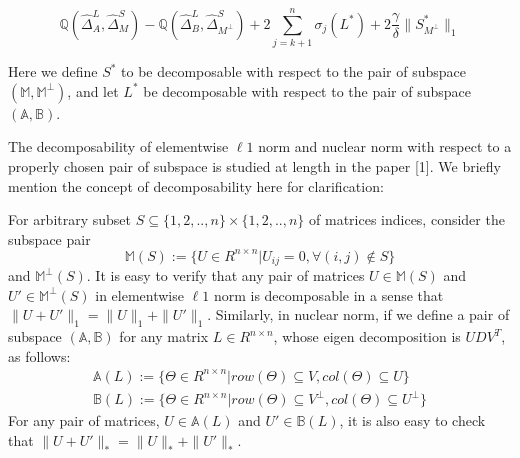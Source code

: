 \documentclass{article}
\begin{document}
\begin{equation}\label{eq:5}
    \mathbb{Q}(\hat{\Delta}^L_{A},\hat{\Delta}^S_{M}) - \mathbb{Q}(\hat{\Delta}^L_{B},\hat{\Delta}^S_{M^\perp})
    +2 \sum_{j=k+1}^{n} \sigma_{j}(L^*) + 2\frac{\gamma}{\delta}\|S^*_{M^\perp}\|_{1}
\end{equation}

Here we define $S^{*}$ to be decomposable with respect to the pair of subspace $(\mathbb{M},\mathbb{M}^{\perp})$, and let $L^{*}$ be decomposable with respect to the pair of subspace $(\mathbb{A},\mathbb{B})$. 

The decomposability of elementwise $\ell 1$ norm and nuclear norm with respect to a properly chosen pair of subspace is studied at length in the paper [1]. We briefly mention the concept of decomposability here for clarification:

For arbitrary subset $S \subseteq \{1,2,..,n\} \times \{1,2,..,n\}$ of matrices indices, consider the subspace pair 
\[
    \mathbb{M}(S) := \{U\in R^{n \times n} | U_{ij} = 0, \forall (i,j) \not\in S \}
\]
and $\mathbb{M}^\perp(S)$. It is easy to verify that any pair of matrices $U\in \mathbb{M}(S)$ and $U' \in \mathbb{M}^\perp(S)$ in elementwise $\ell 1$ norm is decomposable in a sense that $\|U+U'\|_1 = \|U\|_1 + \|U'\|_1$. Similarly, in nuclear norm, if we define a pair of subspace $(\mathbb{A},\mathbb{B})$ for any matrix $L \in R^{n \times n}$, whose eigen decomposition is $UDV^{T}$, as follows:
\begin{align*}
    \mathbb{A}(L) := \{\Theta \in R^{n \times n} | row(\Theta) \subseteq V, col(\Theta) \subseteq U \} \\ 
    \mathbb{B}(L) := \{\Theta \in R^{n \times n} | row(\Theta) \subseteq V^{\perp}, col(\Theta) \subseteq U^{\perp} \} 
\end{align*}
For any pair of matrices, $U\in \mathbb{A}(L)$ and $U' \in \mathbb{B}(L)$, it is also easy to check that $\|U+U'\|_\ast = \|U\|_\ast+\|U'\|_\ast$.
\end{document}
